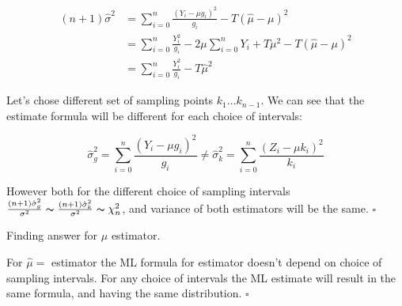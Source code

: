 \begin{solution}
\begin{equation}
\begin{aligned}
(n+1)\hat{\sigma}^2 & = \sum_{i=0}^n\frac{(Y_i - \mu g_i)^2}{g_i} -T(\hat{\mu} - \mu)^2 \\
										& = \sum_{i=0}^n\frac{Y_i^2}{g_i} -2\mu\sum_{i=0}^nY_i + T\mu^2 -T(\hat{\mu} - \mu)^2 \\
										& = \sum_{i=0}^n\frac{Y_i^2}{g_i} -T\hat{\mu}^2
\end{aligned}
\end{equation}

Let's chose different set of sampling points $k_1 \ldots k_{n-1}$. We can see that the estimate formula will be different for each choice of intervals:

\begin{equation}
\hat{\sigma}_g^2 = \sum_{i=0}^{n}\frac{(Y_i-\mu g_i)^2}{g_i} \neq \hat{\sigma}_k^2 =\sum_{i=0}^{n}\frac{(Z_i-\mu k_i)^2}{k_i}			
\end{equation}

However both for the different choice of sampling intervals 
$\frac{(n+1)\hat{\sigma}_g^2}{\sigma^2} \thicksim \frac{(n+1)\hat{\sigma}_k^2}{\sigma^2} \thicksim \chi^2_{n}$, 
and variance of both estimators will be the same. $\square$

\end{solution}

\begin{solution}
Finding answer for $\mu$ estimator.

For $\hat{\mu} = $ estimator the ML formula for estimator doesn't depend on choice of sampling intervals. 
For any choice of intervals the ML estimate will result in the same formula, and having the same distribution. $\square$
\end{solution}